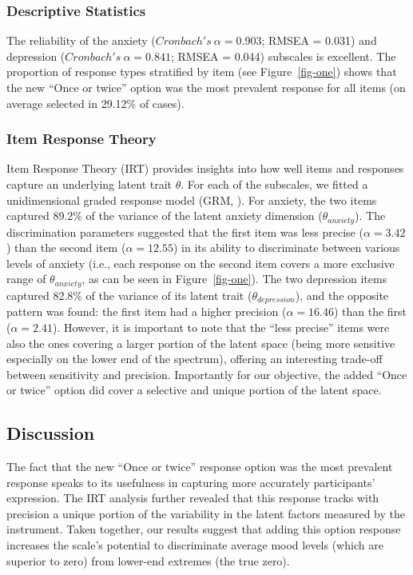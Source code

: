 \documentclass[
  man,
  floatsintext,
  longtable,
  nolmodern,
  notxfonts,
  notimes,
  colorlinks=true,linkcolor=blue,citecolor=blue,urlcolor=blue]{apa7}
\begin{document}
\subsubsection{Descriptive Statistics}\label{descriptive-statistics}

The reliability of the anxiety (\(Cronbach's~\alpha = 0.903\); RMSEA =
0.031) and depression (\(Cronbach's~\alpha = 0.841\); RMSEA = 0.044)
subscales is excellent. The proportion of response types stratified by
item (see Figure~\ref{fig-one}) shows that the new ``Once or twice''
option was the most prevalent response for all items (on average
selected in 29.12\% of cases).

\subsubsection{Item Response Theory}\label{item-response-theory}

Item Response Theory (IRT) provides insights into how well items and
responses capture an underlying latent trait \(\theta\). For each of the
subscales, we fitted a unidimensional graded response model (GRM,
). For anxiety, the two
items captured 89.2\% of the variance of the latent anxiety dimension
(\(\theta_{anxiety}\)). The discrimination parameters suggested that the
first item was less precise (\(\alpha = 3.42\)) than the second item
(\(\alpha = 12.55\)) in its ability to discriminate between various
levels of anxiety (i.e., each response on the second item covers a more
exclusive range of \(\theta_{anxiety}\), as can be seen in
Figure~\ref{fig-one}). The two depression items captured 82.8\% of the
variance of its latent trait (\(\theta_{depression}\)), and the opposite
pattern was found: the first item had a higher precision
(\(\alpha = 16.46\)) than the first (\(\alpha = 2.41\)). However, it is
important to note that the ``less precise'' items were also the ones
covering a larger portion of the latent space (being more sensitive
especially on the lower end of the spectrum), offering an interesting
trade-off between sensitivity and precision. Importantly for our
objective, the added ``Once or twice'' option did cover a selective and
unique portion of the latent space.

\subsection{Discussion}\label{discussion}

The fact that the new ``Once or twice'' response option was the most
prevalent response speaks to its usefulness in capturing more accurately
participants' expression. The IRT analysis further revealed that this
response tracks with precision a unique portion of the variability in
the latent factors measured by the instrument. Taken together, our
results suggest that adding this option response increases the scale's
potential to discriminate average mood levels (which are superior to
zero) from lower-end extremes (the true zero).
\end{document}
